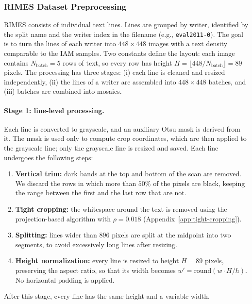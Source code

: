 \begin{appendices}
\subsubsection{RIMES Dataset Preprocessing}
\label{app:rimes-preprocessing}

RIMES consists of individual text lines. Lines are grouped by writer, identified by the split name
and the writer index in the filename (e.g., \texttt{eval2011-0}). The goal is to turn the lines of
each writer into $448\times448$ images with a text density comparable to the IAM samples. Two
constants define the layout: each image contains $N_{\text{batch}} = 5$ rows of text, so every row
has height $H = \lfloor 448 / N_{\text{batch}} \rfloor = 89$ pixels. The processing has three
stages: (i) each line is cleaned and resized independently, (ii) the lines of a writer are
assembled into $448\times448$ batches, and (iii) batches are combined into mosaics.

\paragraph{Stage 1: line-level processing.}
Each line is converted to grayscale, and an auxiliary Otsu mask is derived from it. The mask is
used only to compute crop coordinates, which are then applied to the grayscale line; only the
grayscale line is resized and saved. Each line undergoes the following steps:
\begin{enumerate}
\item \textbf{Vertical trim:} dark bands at the top and bottom of the scan are removed. We
discard the rows in which more than $50\%$ of the pixels are black, keeping the range between the
first and the last row that are not.
\item \textbf{Tight cropping:} the whitespace around the text is removed using the
projection-based algorithm with $\rho = 0.018$ (Appendix~\ref{app:tight-cropping}).
\item \textbf{Splitting:} lines wider than $896$ pixels are split at the midpoint into two
segments, to avoid excessively long lines after resizing.
\item \textbf{Height normalization:} every line is resized to height $H = 89$ pixels, preserving
the aspect ratio, so that its width becomes $w' = \text{round}(w \cdot H / h)$. No horizontal
padding is applied.
\end{enumerate}
After this stage, every line has the same height and a variable width.


\end{appendices}
